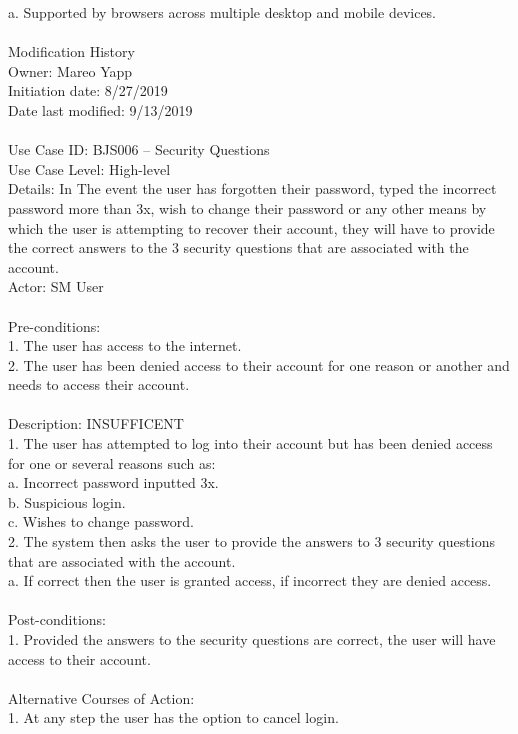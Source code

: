 \documentclass{report}
\begin{document}
	a.	Supported by browsers across multiple desktop and mobile devices.\\
\\
Modification History\\
     Owner: Mareo Yapp\\
     Initiation date: 8/27/2019\\
     Date last modified: 9/13/2019\\
\\
Use Case ID: BJS006 – Security Questions\\
Use Case Level: High-level\\
Details:  In The event the user has forgotten their password, typed the incorrect password more than 3x, wish to change their password or any other means by which the user is attempting to recover their account, they will have to provide the correct answers to the 3 security questions that are associated with the account.\\
Actor: SM User\\
\\
Pre-conditions: \\
1.	The user has access to the internet.\\
2.	The user has been denied access to their account for one reason or another and needs to access their account.\\
\\
Description: INSUFFICENT\\
1.	The user has attempted to log into their account but has been denied access for one or several reasons such as:\\
a.	Incorrect password inputted 3x.\\
b.	Suspicious login.\\
c.	Wishes to change password.\\
2.	The system then asks the user to provide the answers to 3 security questions that are associated with the account.\\
a.	If correct then the user is granted access, if incorrect they are denied access.\\
\\
Post-conditions: \\
1.	Provided the answers to the security questions are correct, the user will have access to their account.\\
\\
Alternative Courses of Action:\\
1.	At any step the user has the option to cancel login.\\
\end{document}
